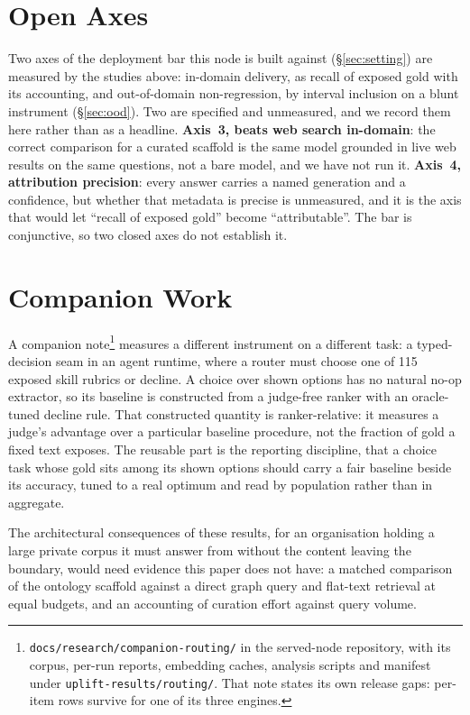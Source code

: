 \documentclass[10pt,twocolumn]{article}
\begin{document}
\section{Open Axes}\label{sec:roadmap}
Two axes of the deployment bar this node is built against (\S\ref{sec:setting}) are measured by the studies above: in-domain delivery, as recall of exposed gold with its accounting, and out-of-domain non-regression, by interval inclusion on a blunt instrument (\S\ref{sec:ood}). Two are specified and unmeasured, and we record them here rather than as a headline.\label{sec:bar} \textbf{Axis~3, beats web search in-domain}: the correct comparison for a curated scaffold is the same model grounded in live web results on the same questions, not a bare model, and we have not run it. \textbf{Axis~4, attribution precision}: every answer carries a named generation and a confidence, but whether that metadata is precise is unmeasured, and it is the axis that would let ``recall of exposed gold'' become ``attributable''. The bar is conjunctive, so two closed axes do not establish it.

\section{Companion Work}\label{sec:companion}
A companion note\footnote{\texttt{docs/research/companion-routing/} in the served-node repository, with its corpus, per-run reports, embedding caches, analysis scripts and manifest under \texttt{uplift-results/routing/}. That note states its own release gaps: per-item rows survive for one of its three engines.} measures a different instrument on a different task: a typed-decision seam in an agent runtime, where a router must choose one of 115 exposed skill rubrics or decline. A choice over shown options has no natural no-op extractor, so its baseline is constructed from a judge-free ranker with an oracle-tuned decline rule. That constructed quantity is ranker-relative: it measures a judge's advantage over a particular baseline procedure, not the fraction of gold a fixed text exposes. The reusable part is the reporting discipline, that a choice task whose gold sits among its shown options should carry a fair baseline beside its accuracy, tuned to a real optimum and read by population rather than in aggregate.

The architectural consequences of these results, for an organisation holding a large private corpus it must answer from without the content leaving the boundary, would need evidence this paper does not have: a matched comparison of the ontology scaffold against a direct graph query and flat-text retrieval at equal budgets, and an accounting of curation effort against query volume.
\end{document}
